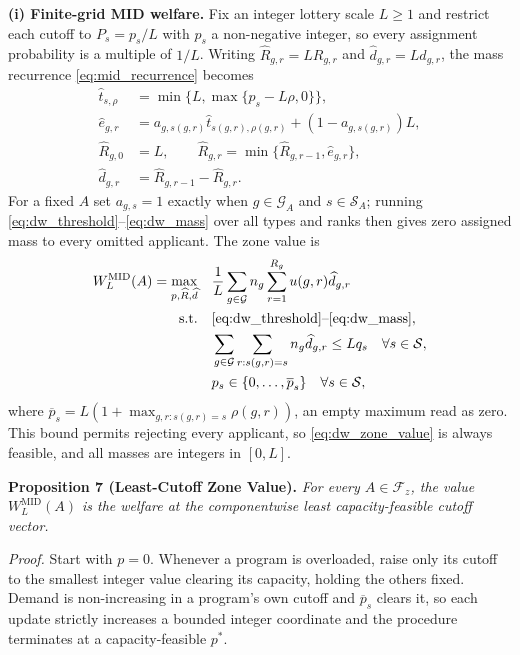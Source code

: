 \documentclass{article}
\begin{document}
\noindent\textbf{(i) Finite-grid MID welfare.}
Fix an integer lottery scale $L \geq 1$ and restrict each cutoff to
$P_s = p_s / L$ with $p_s$ a non-negative integer, so every assignment
probability is a multiple of $1/L$. Writing
$\widehat R_{g,r} = L R_{g,r}$ and $\widehat d_{g,r} = L d_{g,r}$, the mass
recurrence \eqref{eq:mid_recurrence} becomes
\begin{align}
\widehat{t}_{s,\rho} &= \min\{L,\max\{p_s-L\rho,0\}\}, \label{eq:dw_threshold} \\
\widehat{e}_{g,r} &= a_{g,s(g,r)}\widehat{t}_{s(g,r),\rho(g,r)}
                      +(1-a_{g,s(g,r)})L, \label{eq:dw_effective} \\
\widehat{R}_{g,0} &= L, \qquad
\widehat{R}_{g,r} = \min\{\widehat{R}_{g,r-1},\widehat{e}_{g,r}\}, \label{eq:dw_recurrence} \\
\widehat{d}_{g,r} &= \widehat{R}_{g,r-1}-\widehat{R}_{g,r}. \label{eq:dw_mass}
\end{align}
For a fixed $A$ set $a_{g,s} = 1$ exactly when $g \in \mathcal G_A$ and
$s \in \mathcal S_A$; running \eqref{eq:dw_threshold}--\eqref{eq:dw_mass} over
all types and ranks then gives zero assigned mass to every omitted applicant.
The zone value is
\begin{equation}\label{eq:dw_zone_value}
\begin{aligned}
W^{\mathrm{MID}}_L(A) = \max_{p,\widehat{R},\widehat{d}}\quad
& \frac{1}{L}\sum_{g \in \mathcal{G}} n_g
       \sum_{r=1}^{R_g} u(g,r)\widehat{d}_{g,r} \\
\text{s.t.}\quad
& \eqref{eq:dw_threshold}\text{--}\eqref{eq:dw_mass}, \\
& \sum_{g \in \mathcal{G}}\sum_{r:s(g,r)=s}
        n_g\widehat{d}_{g,r} \leq Lq_s
        \quad \forall s \in \mathcal{S}, \\
& p_s \in \{0,\ldots,\overline{p}_s\}
        \quad \forall s \in \mathcal{S},
\end{aligned}
\end{equation}
where $\overline p_s = L(1 + \max_{g,r : s(g,r) = s} \rho(g,r))$, an empty
maximum read as zero. This bound permits rejecting every applicant, so
\eqref{eq:dw_zone_value} is always feasible, and all masses are integers in
$[0, L]$.

\noindent\textbf{Proposition 7 (Least-Cutoff Zone Value).} \textit{For every
$A \in \mathcal F_z$, the value $W^{\mathrm{MID}}_L(A)$ is the welfare at the
componentwise least capacity-feasible cutoff vector.}

\textit{Proof.} Start with $p = 0$. Whenever a program is overloaded, raise only
its cutoff to the smallest integer value clearing its capacity, holding the
others fixed. Demand is non-increasing in a program's own cutoff and
$\overline p_s$ clears it, so each update strictly increases a bounded integer
coordinate and the procedure terminates at a capacity-feasible $p^\ast$.
\end{document}
